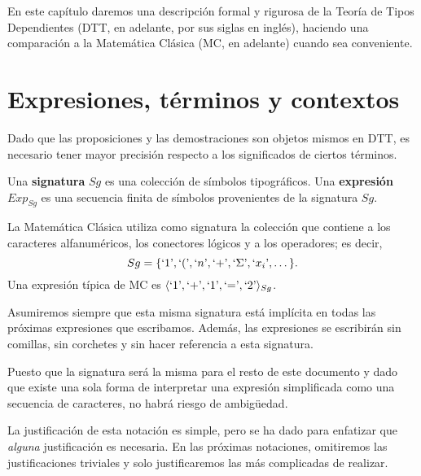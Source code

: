 \documentclass[../main.tex]{subfiles}
\begin{document}
En este cap\'itulo daremos una descripción formal y rigurosa de la Teoría de Tipos Dependientes (DTT, en adelante, por sus siglas en inglés), haciendo una comparación a la Matemática Clásica (MC, en adelante) cuando sea conveniente.

\section{Expresiones, términos y contextos}
Dado que las proposiciones y las demostraciones son objetos mismos en DTT, es necesario tener mayor precisión respecto a los significados de ciertos términos.
\begin{definition}
    Una \textbf{signatura} $Sg$ es una colección de símbolos tipográficos. Una \textbf{expresión} $Exp_{Sg}$ es una secuencia finita de símbolos provenientes de la signatura $Sg$.
\end{definition}
\begin{example}
    La Matem\'atica Cl\'asica utiliza como signatura la colección que contiene a los caracteres alfanuméricos, los conectores lógicos y a los operadores; es decir,
    \[Sg=\{\textrm`1\textrm',\textrm`(\textrm',\textrm`n\textrm',\textrm`{+}\textrm',\textrm`\Sigma\textrm',\textrm`x_i\textrm',\dots\}.\]
    Una expresión típica de MC es $\langle \textrm`1\textrm', \textrm`{+}\textrm', \textrm`1\textrm', \textrm`{=}\textrm', \textrm`2\textrm' \rangle_{Sg}$.
\end{example}
\begin{notation}
    Asumiremos siempre que esta misma signatura está implícita en todas las próximas expresiones que escribamos. Además, las expresiones se escribirán sin comillas, sin corchetes y sin hacer referencia a esta signatura.
\end{notation}
\begin{justification}
    Puesto que la signatura será la misma para el resto de este documento y dado que existe una sola forma de interpretar una expresión simplificada
    como una secuencia de caracteres, no habrá riesgo de ambigüedad.
\end{justification}

La justificación de esta notación es simple, pero se ha dado para enfatizar que \textit{alguna} justificación es necesaria. En las próximas notaciones, omitiremos las justificaciones triviales y solo justificaremos las más complicadas de realizar.
\end{document}
